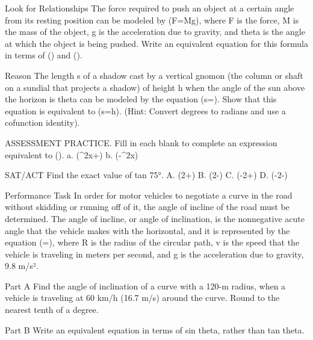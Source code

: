 \documentclass{article}
\newenvironment{practice}[2]{}{}        %
\newcommand{\answer}[1]{}               %
\newcommand{\placeholder}[2]{}          %
\begin{document}
\begin{practice}{34}{2}
Look for Relationships The force required to push an object at a certain angle from its resting position can be modeled by (F=Mg\tan\theta), where F is the force, M is the mass of the object, g is the acceleration due to gravity, and theta is the angle at which the object is being pushed. Write an equivalent equation for this formula in terms of (\sin\theta) and (\sec\theta).
\answer{(F=Mg\sin\theta\sec\theta)}
\end{practice}
\begin{practice}{35}{2}
Reason The length s of a shadow cast by a vertical gnomon (the column or shaft on a sundial that projects a shadow) of height h when the angle of the sun above the horizon is theta can be modeled by the equation (s=). Show that this equation is equivalent to (s=h\cot\theta). (Hint: Convert degrees to radians and use a cofunction identity).
\placeholder{illustration}{Gold circular sundial in perspective on gray octagonal base, Roman numeral hour markings around rim and brown sunburst in center. Upright triangular gnomon outlined orange, vertical side h, horizontal shadow s, orange right-angle square between them.}
\answer{(s=\frac{h\sin(90°-\theta)}{\sin\theta}=\frac{h\sin(\frac\pi2-\theta)}{\sin\theta}=\frac{h\cos\theta}{\sin\theta}=h\cot\theta).}
\end{practice}
\begin{practice}{36}{1}
ASSESSMENT PRACTICE. Fill in each blank to complete an expression equivalent to ().
a. (\sin^2x+)
b. (-\cos^2x)
\answer{a. (\cos^2x) b. (\sin^2x+2\cos^2x)}
\end{practice}
\begin{practice}{37}{1}
SAT/ACT Find the exact value of tan 75°.
A. (2+)
B. (2-)
C. (-2+)
D. (-2-)
\answer{A}
\end{practice}
\begin{practice}{38}{2}
Performance Task In order for motor vehicles to negotiate a curve in the road without skidding or running off of it, the angle of incline of the road must be determined. The angle of incline, or angle of inclination, is the nonnegative acute angle that the vehicle makes with the horizontal, and it is represented by the equation (\tan\theta=), where R is the radius of the circular path, v is the speed that the vehicle is traveling in meters per second, and g is the acceleration due to gravity, 9.8 m/s².
\placeholder{illustration}{Red car on gray banked curved road with double yellow line, desert cacti and mountains. Red line slopes down right beneath car and meets red horizontal baseline; acute angle at right labeled theta.}
Part A Find the angle of inclination of a curve with a 120-m radius, when a vehicle is traveling at 60 km/h (16.7 m/s) around the curve. Round to the nearest tenth of a degree.
\answer{Part A (\theta=13.3°)}
Part B Write an equivalent equation in terms of sin theta, rather than tan theta.
\answer{Part B (\sin\theta=\frac{v^2\cos\theta}{gR})}
\end{practice}
\end{document}

